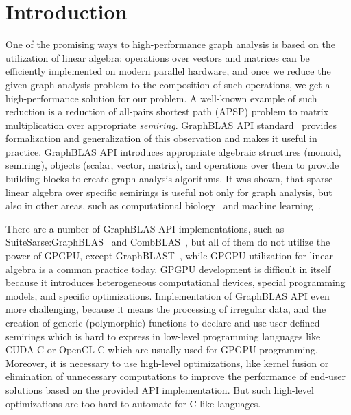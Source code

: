 \section{Introduction}

One of the promising ways to high-performance graph analysis is based on the utilization of linear algebra: operations over vectors and matrices can be efficiently implemented on modern parallel hardware, and once we reduce the given graph analysis problem to the composition of such operations, we get a high-performance solution for our problem.
A well-known example of such reduction is a reduction of all-pairs shortest path (APSP) problem to matrix multiplication over appropriate \textit{semiring}.
GraphBLAS API standard~\cite{7761646} provides formalization and generalization of this observation and makes it useful in practice.
GraphBLAS API introduces appropriate algebraic structures (monoid, semiring), objects (scalar, vector, matrix), and operations over them to provide building blocks to create graph analysis algorithms.
It was shown, that sparse linear algebra over specific semirings is useful not only for graph analysis, but also in other areas, such as computational biology~\cite{10.5555/3433701.3433800} and machine learning~\cite{8091098}.

There are a number of GraphBLAS API implementations, such as SuiteSarse:GraphBLAS~\cite{10.1145/3322125} and CombBLAS~\cite{10.1177/1094342011403516}, but all of them do not utilize the power of GPGPU, except GraphBLAST~\cite{10.1145/3466795}, while GPGPU utilization for linear algebra is a common practice today.
GPGPU development is difficult in itself because it introduces heterogeneous computational devices, special programming models, and specific optimizations.
Implementation of GraphBLAS API even more challenging, because it means the processing of irregular data, and the creation of generic (polymorphic) functions to declare and use user-defined semirings which is hard to express in low-level programming languages like CUDA C or OpenCL C which are usually used for GPGPU programming.
Moreover, it is necessary to use high-level optimizations, like kernel fusion or elimination of unnecessary computations to improve the performance of end-user solutions based on the provided API implementation.
But such high-level optimizations are too hard to automate for C-like languages.

